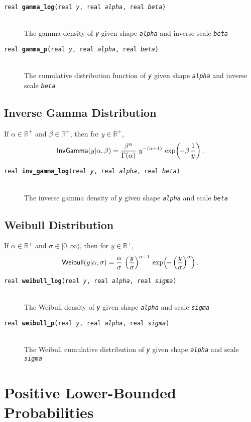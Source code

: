 \documentclass[10pt]{report}
\newcommand{\distro}[1]{\mbox{\sf #1}}
\newcommand{\posreals}{\mathbb{R}^+}
\newcommand{\fitem}[4]{\item[{\tt #1 {\bfseries #2}(#3)}]\mbox{ } \\[4pt] #4}
\newcommand{\farg}[1]{{\tt\slshape #1}}
\begin{document}
\begin{description}
 \fitem{real}{gamma\_log}{real \farg{y}, real \farg{alpha}, real
  \farg{beta}}{The gamma density of \farg{y} given shape
  \farg{alpha} and inverse scale \farg{beta}}
%
  \fitem{real}{gamma\_p}{real \farg{y}, real \farg{alpha}, real
   \farg{beta}}{The cumulative distribution function of \farg{y} given shape
   \farg{alpha} and inverse scale \farg{beta}}
\end{description}

\subsection{Inverse Gamma Distribution}

If $\alpha \in \posreals$ and $\beta \in \posreals$, then for $y \in
\posreals$,
\[
\distro{InvGamma}(y|\alpha,\beta)
= 
\frac{\beta^{\alpha}}
     {\Gamma(\alpha)}
\
y^{-(\alpha + 1)}
\,
\exp \! \left( \! - \beta \, \frac{1}{y} \right)
.
\]

\begin{description}
\fitem{real}{inv\_gamma\_log}{real \farg{y}, real \farg{alpha}, real
\farg{beta}}{The inverse gamma density of \farg{y} given shape
\farg{alpha} and scale \farg{beta}}
\end{description}

\subsection{Weibull Distribution}

If $\alpha \in \posreals$ and $\sigma \in [0,\infty)$, then for $y \in
\posreals$, 
\[
\distro{Weibull}(y|\alpha,\sigma)
= 
\frac{\alpha}{\sigma}
\,
\left( \frac{y}{\sigma} \right)^{\alpha - 1}
\,
\exp \! \left( \! - \left( \frac{y}{\sigma} \right)^{\alpha}  \right)
.
\]

\begin{description}
\fitem{real}{weibull\_log}{real \farg{y}, real \farg{alpha}, real
\farg{sigma}}{The Weibull density of \farg{y} given shape
\farg{alpha} and scale \farg{sigma}}
%
\fitem{real}{weibull\_p}{real \farg{y}, real \farg{alpha}, real
\farg{sigma}}{The Weibull cumulative distribution of \farg{y} given shape
\farg{alpha} and scale \farg{sigma}}
\end{description}



\section{Positive Lower-Bounded Probabilities}
\end{document}
